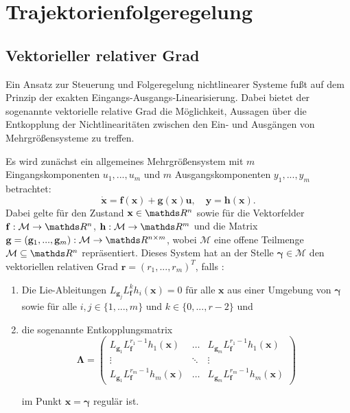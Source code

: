 \section{Trajektorienfolgeregelung}

\subsection{Vektorieller relativer Grad}
\label{sec:definition_relative_degree}

Ein Ansatz zur Steuerung und Folgeregelung nichtlinearer Systeme fußt auf dem Prinzip der exakten Eingangs-Ausgangs-Linearisierung. Dabei bietet der sogenannte vektorielle relative Grad die Möglichkeit, Aussagen über die Entkopplung der Nichtlinearitäten zwischen den Ein- und Ausgängen von Mehrgrößensysteme zu treffen.

Es wird zunächst ein allgemeines Mehrgrößensystem mit $m$ Eingangskomponenten $u_1, ..., u_m$ und $m$ Ausgangskomponenten $y_1, ..., y_m$ betrachtet:
\begin{equation}
	\label{eq:state_space_vector_degree}
	\dot{\mathbf{x}} = \mathbf{f}(\mathbf{x}) + \mathbf{g}(\mathbf{x}) \mathbf{u}, \quad \mathbf{y} = \mathbf{h}(\mathbf{x}).
\end{equation}
Dabei gelte für den Zustand $\mathbf{x} \in \Reals^n$ sowie für die Vektorfelder $\mathbf{f}: \mathcal{M} \rightarrow \Reals^n$, ${\mathbf{h}: \mathcal{M} \rightarrow \Reals^m}$ und die Matrix $\mathbf{g} = (\mathbf{g}_1, ..., \mathbf{g}_m): \mathcal{M} \rightarrow \Reals^{n \times m}$, wobei $\mathcal{M}$ eine offene Teilmenge $\mathcal{M} \subseteq \Reals^{n}$ repräsentiert. Dieses System hat an der Stelle $\boldsymbol{\gamma} \in \mathcal{M}$ den vektoriellen relativen Grad $\mathbf{r} = (r_1, ..., r_m)^T$, falls \cite[S. 194]{NLRT_Roebenack}:
\begin{enumerate}
	\item Die Lie-Ableitungen $L_{\mathbf{g}_j} L_{\mathbf{f}}^k h_i(\mathbf{x}) = 0$ für alle $\mathbf{x}$ aus einer Umgebung von $\boldsymbol{\gamma}$ sowie für alle $i,j \in \{1, ..., m\}$ und $k \in \{0, ..., r-2\}$ und
	\item die sogenannte Entkopplungsmatrix
		\begin{equation}
		\label{eq:decoupling_matrix}
		\boldsymbol{\Lambda} = 
		\left(\begin{matrix}
		L_{\mathbf{g}_1} L_{\mathbf{f}}^{r_1 -1} h_1(\mathbf{x}) & \hdots & L_{\mathbf{g}_m} L_{\mathbf{f}}^{r_1 -1} h_1(\mathbf{x}) \\
		\vdots & \ddots & \vdots \\
		L_{\mathbf{g}_1} L_{\mathbf{f}}^{r_m -1} h_m(\mathbf{x}) & \hdots & L_{\mathbf{g}_m} L_{\mathbf{f}}^{r_m -1} h_m(\mathbf{x})
		\end{matrix}\right) 
	\end{equation}
	
	im Punkt $\mathbf{x} = \boldsymbol{\gamma}$ regulär ist.
\end{enumerate}

